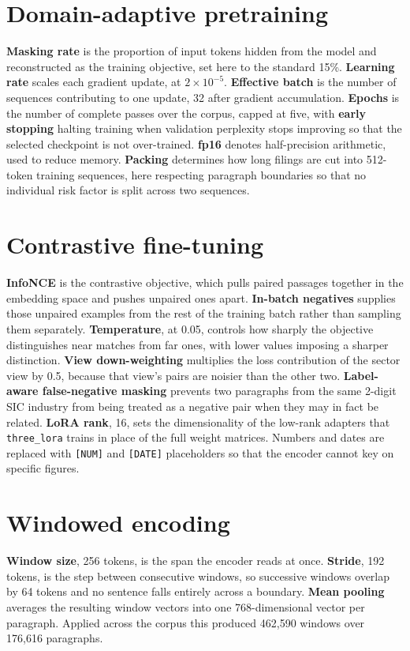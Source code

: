 \documentclass[logo,msc,ai]{infthesis}        %
\begin{document}
\section*{Domain-adaptive pretraining}
\textbf{Masking rate} is the proportion of input tokens hidden from the model and reconstructed as the training objective, set here to the standard 15\%. \textbf{Learning rate} scales each gradient update, at $2\times10^{-5}$. \textbf{Effective batch} is the number of sequences contributing to one update, 32 after gradient accumulation. \textbf{Epochs} is the number of complete passes over the corpus, capped at five, with \textbf{early stopping} halting training when validation perplexity stops improving so that the selected checkpoint is not over-trained. \textbf{fp16} denotes half-precision arithmetic, used to reduce memory. \textbf{Packing} determines how long filings are cut into 512-token training sequences, here respecting paragraph boundaries so that no individual risk factor is split across two sequences.

\section*{Contrastive fine-tuning}
\textbf{InfoNCE} is the contrastive objective, which pulls paired passages together in the embedding space and pushes unpaired ones apart. \textbf{In-batch negatives} supplies those unpaired examples from the rest of the training batch rather than sampling them separately. \textbf{Temperature}, at 0.05, controls how sharply the objective distinguishes near matches from far ones, with lower values imposing a sharper distinction. \textbf{View down-weighting} multiplies the loss contribution of the sector view by 0.5, because that view's pairs are noisier than the other two. \textbf{Label-aware false-negative masking} prevents two paragraphs from the same 2-digit SIC industry from being treated as a negative pair when they may in fact be related. \textbf{LoRA rank}, 16, sets the dimensionality of the low-rank adapters that \texttt{three\_lora} trains in place of the full weight matrices. Numbers and dates are replaced with \texttt{[NUM]} and \texttt{[DATE]} placeholders so that the encoder cannot key on specific figures.

\section*{Windowed encoding}
\textbf{Window size}, 256 tokens, is the span the encoder reads at once. \textbf{Stride}, 192 tokens, is the step between consecutive windows, so successive windows overlap by 64 tokens and no sentence falls entirely across a boundary. \textbf{Mean pooling} averages the resulting window vectors into one 768-dimensional vector per paragraph. Applied across the corpus this produced 462{,}590 windows over 176{,}616 paragraphs.
\end{document}
